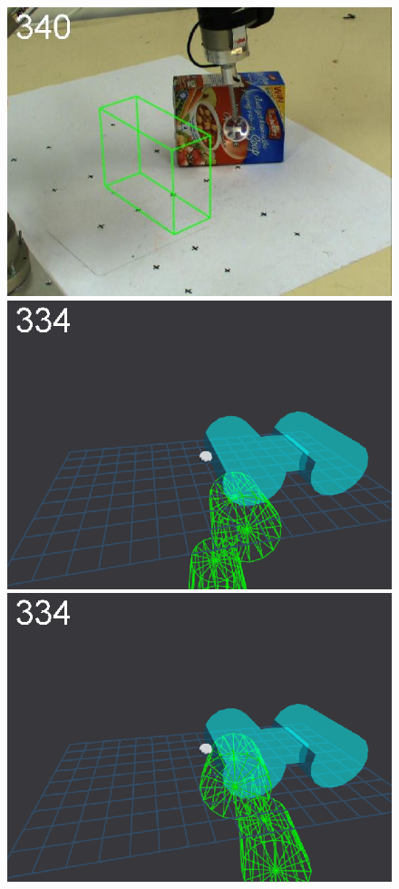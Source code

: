 \begin{figure}[tbp]
{\includegraphics[width=\imgCXwid]{images/C1_LWPR1_87_5}
\includegraphics[width=\imgCXwid]{images/C5_1exp_6_5}
\includegraphics[width=\imgCXwid]{images/C5_2exp_6_5}
}
\end{figure}
